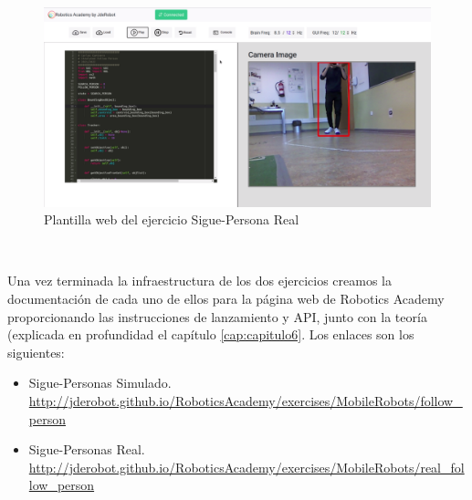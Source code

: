 \begin{figure} [H]
  \begin{center}
    \includegraphics[width=15cm]{imagenes/cap5/plantilla-web-real-follow-person.png}
  \end{center}
  \caption[Plantilla web del ejercicio Sigue-Persona Real]{Plantilla web del ejercicio Sigue-Persona Real}
  \label{fig:plantilla_web_real_follow_person}
\end{figure}\

Una vez terminada la infraestructura de los dos ejercicios creamos la documentación de cada uno de ellos para la página web de Robotics Academy proporcionando las instrucciones de lanzamiento y API, junto con la teoría (explicada en profundidad el capítulo \ref{cap:capitulo6}. Los enlaces son los siguientes:
\begin{itemize}
	\item Sigue-Personas Simulado.\\\url{http://jderobot.github.io/RoboticsAcademy/exercises/MobileRobots/follow_person}
	\item Sigue-Personas Real.\\\url{http://jderobot.github.io/RoboticsAcademy/exercises/MobileRobots/real_follow_person}
\end{itemize}

